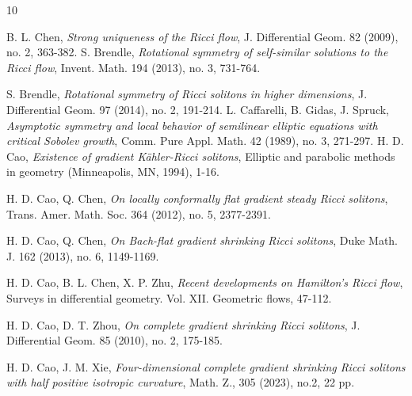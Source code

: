 \documentclass[12pt]{amsart}
\begin{document}
\vspace{0.5cm}	
	\begin{thebibliography}{10}
		
	
		
%		
		B. L. Chen, {\em Strong uniqueness of the Ricci flow}, J. Differential Geom. 82 (2009), no. 2, 363-382.
		S. Brendle, {\em  Rotational symmetry of self-similar solutions to the Ricci flow}, Invent. Math. 194 (2013), no. 3, 731-764.
		
		S. Brendle, {\em Rotational symmetry of Ricci solitons in higher dimensions}, J. Differential Geom. 97 (2014), no. 2, 191-214.
		L. Caffarelli,  B. Gidas,    J. Spruck,   {\em Asymptotic symmetry and local behavior of semilinear elliptic equations with critical Sobolev growth}, Comm. Pure Appl. Math. 42 (1989), no. 3, 271-297.
		H. D. Cao, {\em Existence of gradient K\"ahler-Ricci solitons}, Elliptic and parabolic methods in geometry (Minneapolis, MN, 1994), 1-16.
		
		H. D. Cao, Q. Chen, {\em On locally conformally flat gradient steady Ricci solitons}, Trans. Amer. Math. Soc. 364 (2012), no. 5, 2377-2391.
		
		H. D. Cao, Q. Chen,     {\em On Bach-flat gradient shrinking Ricci solitons}, Duke Math. J. 162 (2013), no. 6, 1149-1169.
		
		H. D. Cao, B. L. Chen, X. P. Zhu, {\em Recent developments on Hamilton's Ricci flow}, Surveys in differential geometry. Vol. XII. Geometric flows, 47-112.
		
		H. D. Cao, D. T. Zhou, {\em On complete gradient shrinking Ricci solitons}, J. Differential Geom. 85 (2010), no. 2, 175-185.
		
		H. D. Cao, J. M. Xie, {\em Four-dimensional complete gradient shrinking Ricci solitons with half positive isotropic curvature}, Math. Z., 305 (2023), no.2, 22 pp.
		

\end{thebibliography}
\end{document}
